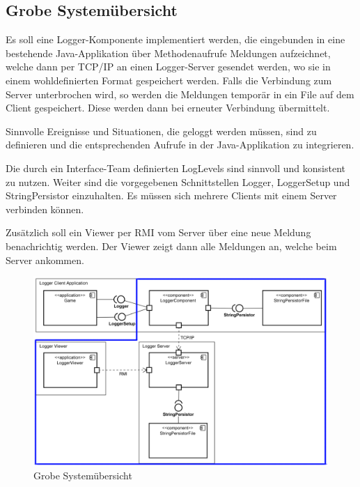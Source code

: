 \documentclass[12pt,a4paper,twosided]{scrartcl}
\begin{document}
\subsection{Grobe Systemübersicht}

Es soll eine Logger-Komponente implementiert werden, die eingebunden in eine bestehende Java-Applikation über Methodenaufrufe Meldungen aufzeichnet, welche dann per TCP/IP an einen Logger-Server gesendet werden, wo sie in einem wohldefinierten Format gespeichert werden. Falls die Verbindung zum Server unterbrochen wird, so werden die
Meldungen temporär in ein File auf dem Client gespeichert. Diese werden dann bei erneuter Verbindung übermittelt.

Sinnvolle Ereignisse und Situationen, die geloggt werden müssen, sind zu definieren
und die entsprechenden Aufrufe in der Java-Applikation zu integrieren.

Die durch ein Interface-Team definierten LogLevels sind sinnvoll und konsistent zu nutzen. Weiter sind die vorgegebenen Schnittstellen Logger, LoggerSetup und StringPersistor einzuhalten. Es müssen sich mehrere Clients mit einem Server verbinden können.

Zusätzlich soll ein Viewer per RMI vom Server über eine neue Meldung benachrichtig werden. Der Viewer zeigt dann alle Meldungen an, welche beim Server ankommen.

\begin{figure}[h]
	\vspace{1cm}
	\centering
	\includegraphics[width=\linewidth]{img/base-system-overview_v2}
	\caption{Grobe Systemübersicht}
	\label{fig:base-system-overview}
\end{figure}
\end{document}
